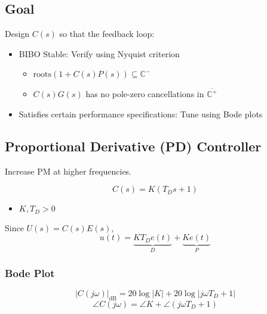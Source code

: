 \subsection{Goal}
\begin{motivation}
    Design $C(s)$ so that the feedback loop: 
    \begin{itemize}
        \item BIBO Stable: Verify using Nyquist criterion
        \begin{itemize}
            \item $\text{roots}(1 + C(s)P(s)) \subseteq \mathbb{C}^-$
            \item $C(s)G(s)$ has no pole-zero cancellations in $\overline{\mathbb{C}^+}$
        \end{itemize}
        \item Satisfies certain performance specifications: Tune using Bode plots
    \end{itemize}
\end{motivation}

\subsection{Proportional Derivative (PD) Controller}
\begin{motivation}
    Increase PM at higher frequencies. 
\end{motivation}

\begin{definition}
    \begin{equation}
        C(s) = K(T_D s + 1)
    \end{equation}
    \begin{itemize}
        \item $K,T_D > 0$
    \end{itemize}
    \vspace{1em}

    Since $U(s) = C(s)E(s)$, 
    \begin{equation}
        u(t) = \underbrace{K T_D e(t)}_{D} + \underbrace{K e(t)}_{P}
    \end{equation}
\end{definition}

\subsubsection{Bode Plot}
\begin{notes}
    \begin{equation*}
        |C(j\omega)|_{\text{dB}} = 20 \log |K| + 20 \log |j \omega T_D + 1|
    \end{equation*}
    \begin{equation*}
        \angle C(j\omega) = \angle K + \angle (j \omega T_D + 1)
    \end{equation*}
\end{notes}


